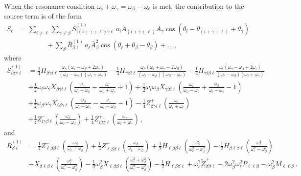 \documentclass[letterpaper,11pt]{article}
\newcommand{\oi}{\omega_i}
\newcommand{\ol}{\omega_\ell}
\newcommand{\obet}{\omega_{\beta}}
\newcommand{\ogam}{\omega_\gamma}
\begin{document}
When the resonance condition $\oi + \ogam = \obet - \ol$ is met, the contribution to the source term is of the form
\begin{align}
\label{intpluschi1 source}
S_\ell &= \sum_{i \neq \ell} \sum_{\gamma \neq \beta} \overline{S}^{(1)}_{i (i + \gamma + \ell) \gamma \ell} \, a_i \bar A_{(i + \gamma + \ell)} \bar A_\gamma \cos \left( \theta_i - \theta_{(i + \gamma + \ell)} + \theta_\gamma \right) \nonumber \\
%
& \qquad \qquad + \sum_\beta \overline{R}^{(1)}_{\beta \ell} \, a_\ell \bar A_\beta^2  \cos \left(\theta_\ell + \theta_\beta - \theta_\beta \right) + \ldots \, ,
\end{align}
where 
\begin{align}
\overline{S}^{(1)}_{i \beta\gamma\ell} &= \frac{1}{4} H_{\beta\gamma i \ell} \frac{ \ogam (\oi - \obet + 2\ogam)}{(\obet - \ogam)(\oi + \ogam)} - \frac{1}{4} H_{\gamma\beta i \ell} \frac{\obet(\oi + \ogam - 2\obet)}{(\oi - \obet)(\obet - \ogam)} - \frac{1}{4} H_{\gamma i \beta\ell} \frac{\oi (\ogam - \obet + 2\oi)}{(\oi - \obet)(\oi + \ogam)} \nonumber \\
%
& + \frac{1}{2} \oi \ogam X_{\beta\gamma i \ell} \left( \frac{\ogam}{\oi - \obet} - \frac{\oi}{\obet + \ogam} + 1 \right) + \frac{1}{2} \oi \obet X_{\gamma\beta i \ell} \left( \frac{\oi}{\obet - \ogam} + \frac{\obet}{\oi + \ogam} - 1 \right) \nonumber \\
%
& + \frac{1}{2} \obet \ogam X_{i\beta\gamma\ell} \left(\frac{\obet}{\oi + \ogam} - \frac{\ogam}{\oi - \obet} - 1 \right) - \frac{1}{4} Z^+_{\beta\gamma i \ell} \left( \frac{\oi}{\oi + \ol}\right)  \nonumber \\
%
& + \frac{1}{4} Z^{-}_{i\gamma\beta\ell} \left(  \frac{\obet}{\ol - \obet}  \right) + \frac{1}{4} Z^+_{i\beta\gamma\ell} \left( \frac{\ogam}{\ol + \ogam} \right) \, ,
\end{align}
and
\begin{align}
\overline{R}^{(1)}_{\beta \ell} &= \frac{1}{4} Z^{-}_{\ell \beta \beta \ell} \left( \frac{\obet}{\ol + \obet} \right) +  \frac{1}{4} Z^+_{\ell \beta \beta \ell} \left(\frac{\obet}{\ol - \obet} \right) + \frac{1}{2} H_{\ell\beta\beta\ell} \left( \frac{\obet^2}{\ol^2 - \obet^2} \right) - \frac{1}{2} H_{\beta \ell\beta\ell} \left( \frac{\ol^2}{\ol^2 - \obet^2} \right) \nonumber \\
%
& + X_{\beta\ell\beta\ell} \left( \frac{\ol^4}{\ol^2 - \obet^2} \right)  - \frac{1}{2} \obet^2  X_{\ell\beta\beta\ell} \left(\frac{\ol^2 + \obet^2 }{\ol^2 - \obet^2} \right)  - \frac{1}{2} H_{\ell\beta\beta\ell} + \ol^2 \tilde{Z}^+_{\beta\beta\ell} -2 \obet^2 \ol^2 P_{\ell\ell\beta} - \obet^2 M_{\ell\ell\beta} \, .
\end{align}
\end{document}
